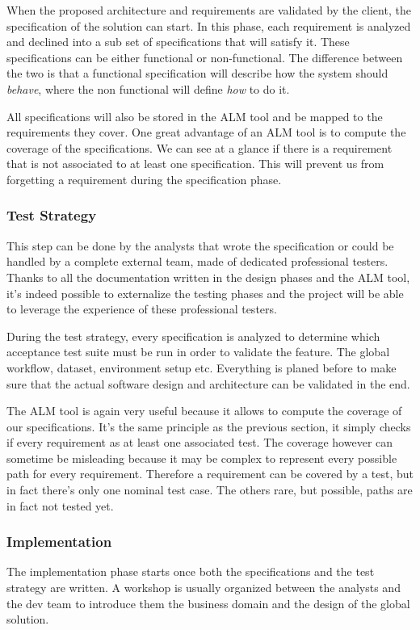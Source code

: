 When the proposed architecture and requirements are validated by the client,
the specification of the solution can start.
In this phase, each requirement is analyzed and declined into a sub set of
specifications that will satisfy it.
These specifications can be either functional or non-functional.
The difference between the two is that a functional specification will
describe how the system should \textit{behave}, where the non functional will
define \textit{how} to do it.

All specifications will also be stored in the ALM tool and be mapped to
the requirements they cover.
One great advantage of an ALM tool is to compute the coverage of the
specifications.
We can see at a glance if there is a requirement that is not associated to at
least one specification.
This will prevent us from forgetting a requirement during the specification
phase.

\subsubsection{Test Strategy}
This step can be done by the analysts that wrote the specification or could be
handled by a complete external team, made of dedicated professional testers.
Thanks to all the documentation written in the design phases and the ALM tool,
it's indeed possible to externalize the testing phases and the project will be
able to leverage the experience of these professional testers.

During the test strategy, every specification is analyzed to determine which
acceptance test suite must be run in order to validate the feature.
The global workflow, dataset, environment setup etc.
Everything is planed before to make sure that the actual software design and
architecture can be validated in the end.

The ALM tool is again very useful because it allows to compute the coverage
of our specifications.
It's the same principle as the previous section, it simply checks if every
requirement as at least one associated test.
The coverage however can sometime be misleading because it may be complex to
represent every possible path for every requirement.
Therefore a requirement can be covered by a test, but in fact there's only one
nominal test case.
The others rare, but possible, paths are in fact not tested yet.

\subsubsection{Implementation}
The implementation phase starts once both the specifications  and
the test strategy are written.
A workshop is usually organized between the analysts and the dev team to
introduce them the business domain and the design of the global solution.

